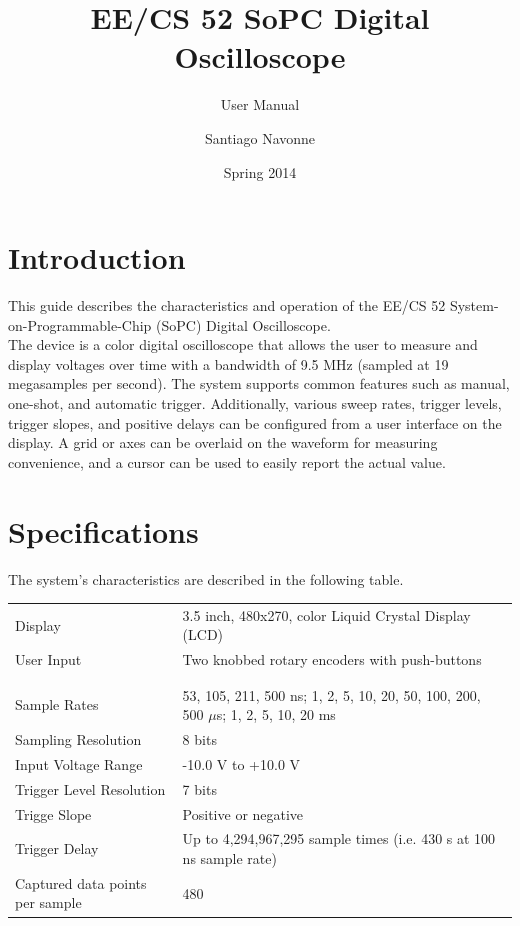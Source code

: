 \documentclass{scrartcl}
\begin{document}

	\title{EE/CS 52 SoPC Digital Oscilloscope}
	\subtitle{User Manual}
	\author{Santiago Navonne} 
	\date{Spring 2014} 
	\maketitle
	
	\section{Introduction}
	This guide describes the characteristics and operation of the EE/CS 52 System-on-Programmable-Chip (SoPC) Digital Oscilloscope.\\
	
	The device is a color digital oscilloscope that allows the user to measure and display voltages over time with a bandwidth of 9.5 MHz (sampled at 19 megasamples per second). The system supports common features such as manual, one-shot, and automatic trigger. Additionally, various sweep rates, trigger levels, trigger slopes, and positive delays can be configured from a user interface on the display. A grid or axes can be overlaid on the waveform for measuring convenience, and a cursor can be used to easily report the actual value.
	
	\section{Specifications}
	The system's characteristics are described in the following table.

	\begin{center}
    		\begin{tabular}{ p{5cm} p{10cm} }
		Display & 3.5 inch, 480x270, color Liquid Crystal Display (LCD) \\
		User Input & Two knobbed rotary encoders with push-buttons \\
		\\ \hline \\
		Sample Rates & 53, 105, 211, 500 ns; 1, 2, 5, 10, 20, 50, 100, 200, 500 $\mu$s; 1, 2, 5, 10, 20 ms \\
		Sampling Resolution & 8 bits \\
		Input Voltage Range & -10.0 V to +10.0 V \\
		Trigger Level Resolution & 7 bits \\
		Trigge Slope & Positive or negative \\
		Trigger Delay & Up to 4,294,967,295 sample times (i.e. 430 s at 100 ns sample rate) \\
		Captured data points per sample & 480
		\end{tabular}
	\end{center}
		
\end{document}
